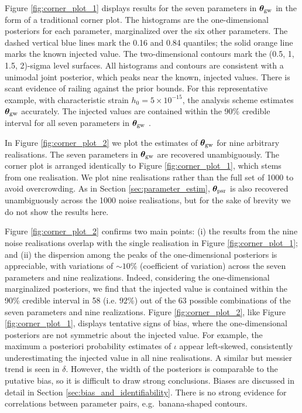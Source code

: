 \documentclass[fleqn,usenatbib,useAMS]{mnras}
\begin{document}
Figure \ref{fig:corner_plot_1} displays results for the seven parameters in  $\boldsymbol{\theta}_{\rm gw}$ in the form of a traditional corner plot. The histograms are the one-dimensional posteriors for each parameter, marginalized over the six other parameters. The dashed vertical blue lines mark the 0.16 and 0.84 quantiles; the solid orange line marks the known injected value. The two-dimensional contours mark the (0.5, 1, 1.5, 2)-sigma level surfaces. All histograms and contours are consistent with a unimodal joint posterior, which peaks near the known, injected values. There is scant evidence of railing against the prior bounds. For this representative example, with characteristic strain $h_0 = 5 \times 10^{-15}$, the analysis scheme estimates $\boldsymbol{\theta}_{\rm gw}$ accurately. The injected values are contained within the 90\% credible interval for all seven parameters in $\boldsymbol{\theta}_{\rm gw}$ . \newline 


In Figure \ref{fig:corner_plot_2} we plot the estimates of $\boldsymbol{\theta}_{\rm gw}$ for nine arbitrary realisations. The seven parameters in ${\boldsymbol{\theta}}_{\rm gw}$ are recovered unambiguously. The corner plot is arranged identically to Figure \ref{fig:corner_plot_1}, which stems from one realisation. We plot nine realisations rather than the full set of 1000 to avoid overcrowding. As in Section \ref{sec:parameter_estim}, $\boldsymbol{\theta}_{\rm psr}$ is also recovered unambiguously across the 1000 noise realisations, but for the sake of brevity we do not show the results here. \newline 


Figure \ref{fig:corner_plot_2} confirms two main points: (i) the results from the nine noise realisations overlap with the single realisation in  Figure \ref{fig:corner_plot_1}; and (ii) the dispersion among the peaks of the one-dimensional posteriors is appreciable, with variations of $\sim10 \%$ (coefficient of variation) across the seven parameters and nine realizations. Indeed, considering the one-dimensional marginalized posteriors, we find that the injected value is contained within the 90\% credible interval in 58 (i.e. $92 \%$) out of the 63 possible combinations of the seven parameters and nine realizations. Figure \ref{fig:corner_plot_2}, like Figure \ref{fig:corner_plot_1}, displays tentative signs of bias, where the one-dimensional posteriors are not symmetric about the injected value. For example, the maximum a posteriori probability estimates of $\iota$ appear left-skewed, consistently underestimating the injected value in all nine realisations. A similar but messier trend is seen in $\delta$. However, the width of the posteriors is comparable to the putative bias, so it is difficult to draw strong conclusions. Biases are discussed in detail in Section \ref{sec:bias_and_identifiability}. There is no strong evidence for correlations between parameter pairs, e.g.\ banana-shaped contours. \newline 
\end{document}
